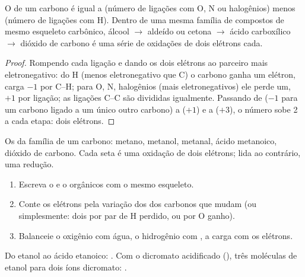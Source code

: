 \begin{proposition}\label{prop:b1:organic-redox:on-of-carbon}
O  de um carbono é igual a (número de ligações com O, N
ou halogênios) menos (número de ligações com H). Dentro de uma mesma
família de compostos de mesmo esqueleto carbônico, álcool $\to$ aldeído
ou cetona $\to$ ácido carboxílico $\to$ dióxido de carbono é uma série de
oxidações de dois elétrons cada.
\end{proposition}

\begin{proof}
Rompendo cada ligação e dando os dois elétrons ao parceiro mais
eletronegativo: do H (menos eletronegativo que C) o carbono ganha um
elétron, carga $-1$ por C--H; para O, N, halogênios (mais eletronegativos)
ele perde um, $+1$ por ligação; as ligações C--C são divididas igualmente.
Passando de  ($-1$ para um carbono ligado a um único outro
carbono) a  ($+1$) e a  ($+3$), o número sobe 2 a cada
etapa: dois elétrons.
\end{proof}

\begin{omfigure}

{\small Os  da família de um carbono: metano, metanol,
metanal, ácido metanoico, dióxido de carbono. Cada seta é uma oxidação de
dois elétrons; lida ao contrário, uma redução.}
\end{omfigure}

\begin{method}\label{met:b1:organic-redox:balance-organic-redox}
\begin{enumerate}
  \item Escreva o  e o  orgânicos com o mesmo esqueleto.
  \item Conte os elétrons pela variação dos  dos
        carbonos que mudam (ou simplesmente: dois por par de H perdido, ou
        por O ganho).
  \item Balanceie o oxigênio com água, o hidrogênio com , a carga
        com os elétrons.
\end{enumerate}
Do etanol ao ácido etanoico: .
Com o dicromato acidificado (),
três moléculas de etanol para dois íons dicromato:
.
\end{method}

